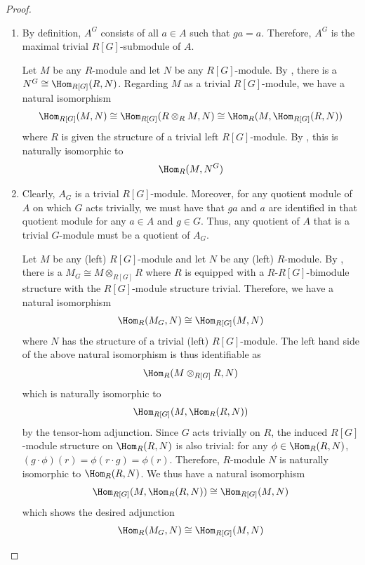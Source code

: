 \begin{proof}
    \begin{enumerate}
        \item By definition, $A^G$ consists of all $a \in A$ such that $ga = a$. Therefore, $A^G$ is the maximal trivial $R[G]$-submodule of $A$.

        Let $M$ be any $R$-module and let $N$ be any $R[G]$-module. By , there is a  $N^G \cong \Hom_{R[G]}(R,N)$. Regarding $M$ as a trivial $R[G]$-module, we have a natural isomorphism
        $$\Hom_{R[G]}(M, N) \cong \Hom_{R[G]}(R \otimes_R M, N) \cong \Hom_R(M, \Hom_{R[G]}(R,N))$$
        where $R$ is given the structure of a trivial left $R[G]$-module. By , this is naturally isomorphic to 
        $$\Hom_{R}(M, N^G)$$

        \item Clearly, $A_G$ is a trivial $R[G]$-module. Moreover, for any quotient module of $A$ on which $G$ acts trivially, we must have that $ga$ and $a$ are identified in that quotient module for any $a \in A$ and $g \in G$. Thus, any quotient of $A$ that is a trivial $G$-module must be a quotient of $A_G$.

        Let $M$ be any (left) $R[G]$-module and let $N$ be any (left) $R$-module. By , there is a  $M_G \cong M \otimes_{R[G]} R$ where $R$ is equipped with a $R$-$R[G]$-bimodule structure with the $R[G]$-module structure trivial. Therefore, we have a natural isomorphism
        $$\Hom_R(M_G, N) \cong \Hom_{R[G]}(M, N)$$
        where $N$ has the structure of a trivial (left) $R[G]$-module. The left hand side of the above natural isomorphism is thus identifiable as 
        $$\Hom_R(M \otimes_{R[G]} R, N)$$
        which is naturally isomorphic to 
        $$\Hom_{R[G]}(M, \Hom_{R}(R, N))$$
        by the tensor-hom adjunction. Since $G$ acts trivially on $R$, the induced $R[G]$-module structure on $\Hom_R(R, N)$ is also trivial: for any $\phi \in \Hom_R(R, N)$, $(g \cdot \phi)(r) = \phi(r \cdot g) = \phi(r)$.  Therefore, $R$-module $N$ is naturally isomorphic to $\Hom_R(R, N)$. We thus have a natural isomorphism 
        $$\Hom_{R[G]}(M, \Hom_{R}(R, N)) \cong \Hom_{R[G]}(M, N)$$
        which shows the desired adjunction
        $$\Hom_R(M_G, N) \cong \Hom_{R[G]}(M, N)$$

    \end{enumerate}
\end{proof}